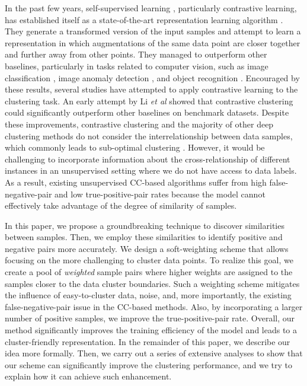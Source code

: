 \documentclass{bmvc2k}
\newcommand{\shadow}[1]{}
\def\s{\shadow}
\def\etal{\emph{et al}\bmvaOneDot}
\begin{document}
In the past few years, self-supervised learning \cite{Rotate,lin2021inter,tiwari2021self}, particularly contrastive learning, has established itself as a state-of-the-art representation learning algorithm \cite{SimCLR}. They generate a transformed version of the input samples and attempt to learn a representation in which augmentations of the same data point are closer together and further away from other points. They managed to outperform other baselines, particularly in tasks related to computer vision, such as image classification \cite{SimCLR}, image anomaly detection \cite{Hojjati2022SelfSupervisedAD}, and object recognition \cite{Objectrecognition}. Encouraged by these results, several studies have attempted to apply contrastive learning to the clustering task. An early attempt by Li \etal \cite{CC} showed that contrastive clustering could significantly outperform other baselines on benchmark datasets. Despite these improvements, contrastive clustering and the majority of other deep clustering methods do not consider the interrelationship between data samples, which commonly leads to sub-optimal clustering \cite{DCSS}. However, it would be challenging to incorporate information about the cross-relationship of different instances in an unsupervised setting where we do not have access to data labels. As a result, existing unsupervised CC-based algorithms suffer from high false-negative-pair and low true-positive-pair rates because the model cannot effectively take advantage of the degree of similarity of samples.

\s{INCLUDE and describe here that the existing unsupervised CC-based methods suffer from high false-negative-pair and low positive-pair rate. Explain why this is the case... then in the next paragraph say that our C3 method solves it by discovering the samples similarities ....   apply it to the whole paper in abstract, ...  }

In this paper, we propose a groundbreaking technique to discover similarities between samples. Then, we employ these similarities to identify positive and negative pairs more accurately. We design a soft-weighting scheme that allows focusing on the more challenging to cluster data points. To realize this goal, we create a pool of \textit{weighted} sample pairs where higher weights are assigned to the samples closer to the data cluster boundaries. Such a weighting scheme mitigates the influence of easy-to-cluster data, noise, and, more importantly, the existing false-negative-pair issue in the CC-based methods. Also, by incorporating a larger number of positive samples, we improve the true-positive-pair rate. \s{A  DISCUSSION ON INCREASING TPPR MUST BE ADDED HERE AS WELL. } Overall, our method significantly improves the training efficiency of the model and leads to a cluster-friendly representation. In the remainder of this paper, we describe our idea more formally. Then, we carry out a series of extensive analyses to show that our scheme can significantly improve the clustering performance, and we try to explain how it can achieve such enhancement.
\end{document}
